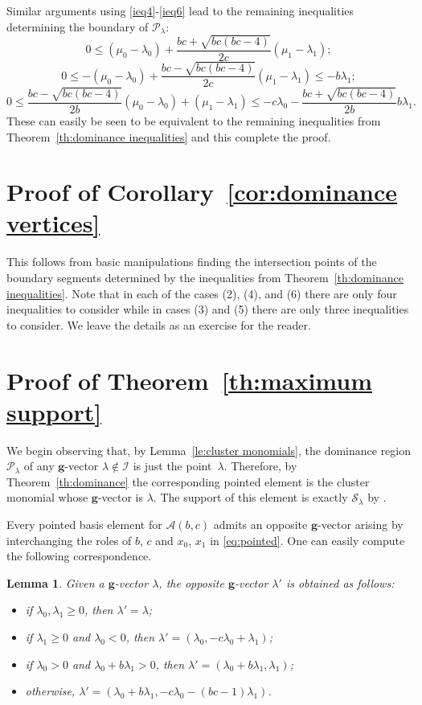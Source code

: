 \documentclass[pdflatex,sn-mathphys]{sn-jnl}%
\theoremstyle{thmstyleone}%
\newtheorem{lemma}[theorem]{Lemma}
\theoremstyle{thmstyletwo}%
\theoremstyle{thmstylethree}%
\newcommand{\bfg}{\boldsymbol{g}}
\newcommand{\cA}{\mathcal{A}}
\newcommand{\cI}{\mathcal{I}}
\newcommand{\cP}{\mathcal{P}}
\newcommand{\cS}{\mathcal{S}}
\begin{document}
  Similar arguments using \eqref{ieq4}-\eqref{ieq6} lead to the remaining inequalities determining the boundary of $\cP_\lambda$:
  \[ 0 \le (\mu_0-\lambda_0)+\frac{bc+\sqrt{bc(bc-4)}}{2c}(\mu_1-\lambda_1);\]
  \[ 0 \le -(\mu_0-\lambda_0)+\frac{bc-\sqrt{bc(bc-4)}}{2c}(\mu_1-\lambda_1) \le -b\lambda_1;\]
  \[ 0 \le \frac{bc-\sqrt{bc(bc-4)}}{2b}(\mu_0-\lambda_0)+(\mu_1-\lambda_1) \le -c\lambda_0-\frac{bc+\sqrt{bc(bc-4)}}{2b}b\lambda_1.\]
  These can easily be seen to be equivalent to the remaining inequalities from Theorem~\ref{th:dominance inequalities} and this complete the proof.


\section{Proof of Corollary~\ref{cor:dominance vertices}}
\label{sec:dominance vertices}

  This follows from basic manipulations finding the intersection points of the boundary segments determined by the inequalities from Theorem~\ref{th:dominance inequalities}.
  Note that in each of the cases (2), (4), and (6) there are only four inequalities to consider while in cases (3) and (5) there are only three inequalities to consider.
  We leave the details as an exercise for the reader.


\section{Proof of Theorem~\ref{th:maximum support}}
\label{sec:maximum support} 
  
  We begin observing that, by Lemma~\ref{le:cluster monomials}, the dominance region $\cP_\lambda$ of any $\bfg$-vector $\lambda\not\in\cI$ is just the point~$\lambda$.
  Therefore, by Theorem~\ref{th:dominance} the corresponding pointed element is the cluster monomial whose $\bfg$-vector is $\lambda$. 
  The support of this element is exactly $\cS_\lambda$ by \cite[Proposition 4.1]{LLZ14}.
  
  Every pointed basis element for $\cA(b,c)$ admits an opposite $\bfg$-vector arising by interchanging the roles of $b$, $c$ and $x_0$, $x_1$ in \eqref{eq:pointed}. 
  One can easily compute the following correspondence.
  \begin{lemma}
    Given a $\bfg$-vector $\lambda$, the opposite $\bfg$-vector $\lambda'$ is obtained as follows:
    \begin{itemize}
      \item if $\lambda_0,\lambda_1\ge0$, then $\lambda'=\lambda$;
      \item if $\lambda_1\ge0$ and $\lambda_0<0$, then $\lambda'=(\lambda_0,-c\lambda_0+\lambda_1)$;
      \item if $\lambda_0>0$ and $\lambda_0+b\lambda_1>0$, then $\lambda'=(\lambda_0+b\lambda_1,\lambda_1)$;
      \item otherwise, $\lambda'=(\lambda_0+b\lambda_1,-c\lambda_0-(bc-1)\lambda_1)$.
    \end{itemize}
  \end{lemma}
\end{document}
